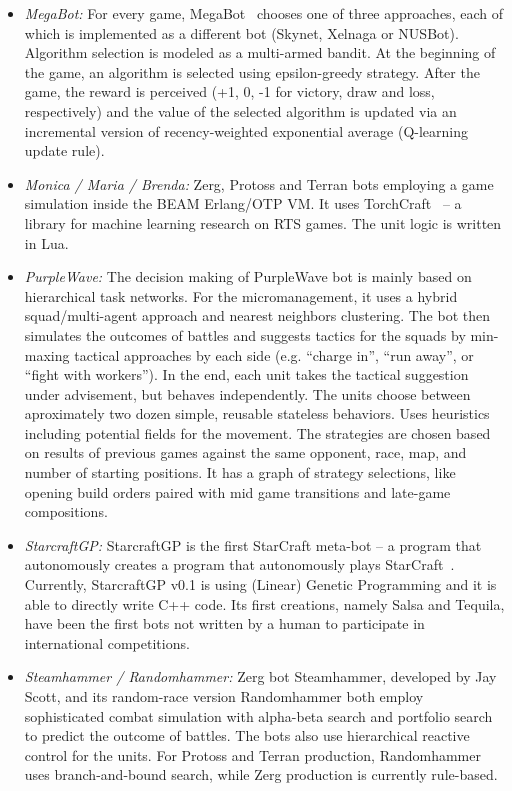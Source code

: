 \begin{itemize}
  \item {\em MegaBot:} For every game, MegaBot~\cite{tavares2016rock} chooses one of three approaches, each of which is implemented as a different bot (Skynet, Xelnaga or NUSBot). Algorithm selection is modeled as a multi-armed bandit. At the beginning of the game, an algorithm is selected using epsilon-greedy strategy. After the game, the reward is perceived (+1, 0, -1 for victory, draw and loss, respectively) and the value of the selected algorithm is updated via an incremental version of recency-weighted exponential average (Q-learning update rule).
  
  \item {\em  Monica / Maria / Brenda:} Zerg, Protoss and Terran bots employing a game simulation inside the BEAM Erlang/OTP VM. It uses TorchCraft~\cite{synnaeve2016torchcraft}  -- a library for machine learning research on RTS games. The unit logic is written in Lua.
  
  \item {\em PurpleWave:} The decision making of PurpleWave bot is mainly based on hierarchical task networks. For the micromanagement, it uses a hybrid squad/multi-agent approach and nearest neighbors clustering. The bot then simulates the outcomes of battles and suggests tactics for the squads by min-maxing tactical approaches by each side (e.g. ``charge in'', ``run away'', or ``fight with workers''). In the end, each unit takes the tactical suggestion under advisement, but behaves independently. The units choose between aproximately two dozen simple, reusable stateless behaviors. Uses heuristics including potential fields for the movement. The strategies are chosen based on results of previous games against the same opponent, race, map, and number of starting positions. It has a graph of strategy selections, like opening build orders paired with mid game transitions and late-game compositions.
  
  \item {\em StarcraftGP:} StarcraftGP is the first StarCraft meta-bot -- a program that autonomously creates a program that autonomously plays StarCraft~\cite{garcia2015towards}. Currently, StarcraftGP v0.1 is using (Linear) Genetic Programming and it is able to directly write C++ code. Its first creations, namely Salsa and Tequila, have been the first bots not written by a human to participate in international competitions.

  \item {\em Steamhammer / Randomhammer:} Zerg bot Steamhammer, developed by Jay Scott, and its random-race version Randomhammer both employ sophisticated combat simulation with alpha-beta search and portfolio search to predict the outcome of battles. The bots also use hierarchical reactive control for the units. For Protoss and Terran production, Randomhammer uses branch-and-bound search, while Zerg production is currently rule-based.


\end{itemize}
